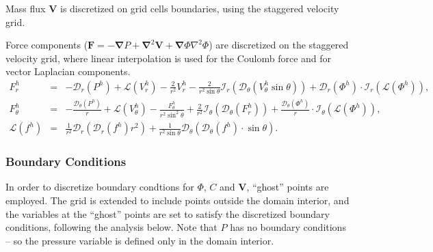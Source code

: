 \documentclass[10pt]{ijnam}
\newcommand{\pars}[1]{\left(#1\right)}
\newcommand\Laplacian{\nabla^2}
\newcommand\bnabla{\boldsymbol{\nabla}}
\newcommand\bLaplacian{\boldsymbol{\nabla}^2}
\newcommand\bV{\boldsymbol{V}}
\newcommand\bF{\boldsymbol{F}}
\newcommand\cI{\mathcal{I}}
\newcommand\cD{\mathcal{D}}
\newcommand\cL{\mathcal{L}}
\begin{document}
Mass flux $\bV$ is discretized on grid cells boundaries, 
using the staggered velocity grid.

Force components ($\bF = -\bnabla P + \bLaplacian \bV + \bnabla \varPhi \Laplacian \varPhi$) 
are discretized on the staggered velocity grid, where
linear interpolation is used for the Coulomb force and for vector Laplacian components.
\begin{eqnarray*}
F^h_r &=& -\cD_r(P^h) 
          + \cL(V^h_r) - \frac{2}{r^2} V^h_r 
		  - \frac{2}{r^2 \sin\theta} \cI_r(\cD_\theta (V^h_\theta \sin\theta))
          + \cD_r(\varPhi^h) \cdot \cI_r(\cL(\varPhi^h)), \\
F^h_\theta &=& -\frac{\cD_\theta(P^h)}{r} 
		  + \cL(V^h_\theta) - \frac{F^h_\theta}{r^2 \sin^2\theta} 
		  + \frac{2}{r^2} \cI_\theta(\cD_\theta(F^h_r))
		  + \frac{\cD_\theta(\varPhi^h)}{r} \cdot \cI_\theta(\cL(\varPhi^h)), \\
\cL(f^h) &=& \frac{1}{r^2}\cD_r\pars{\cD_r(f^h) r^2} + 
\frac{1}{r^2 \sin\theta} \cD_\theta\pars{\cD_\theta(f^h) \cdot \sin\theta}.
\end{eqnarray*}


\subsubsection{Boundary Conditions}
In order to discretize boundary condtions for $\varPhi$, $C$ and $\bV$, 
``ghost'' points are employed. 
The grid is extended to include points outside the domain interior,
and the variables at the ``ghost'' points are set to satisfy 
the discretized boundary conditions, following the analysis below.
Note that $P$ has no boundary conditions -- so the pressure variable is defined 
only in the domain interior.
\end{document}
